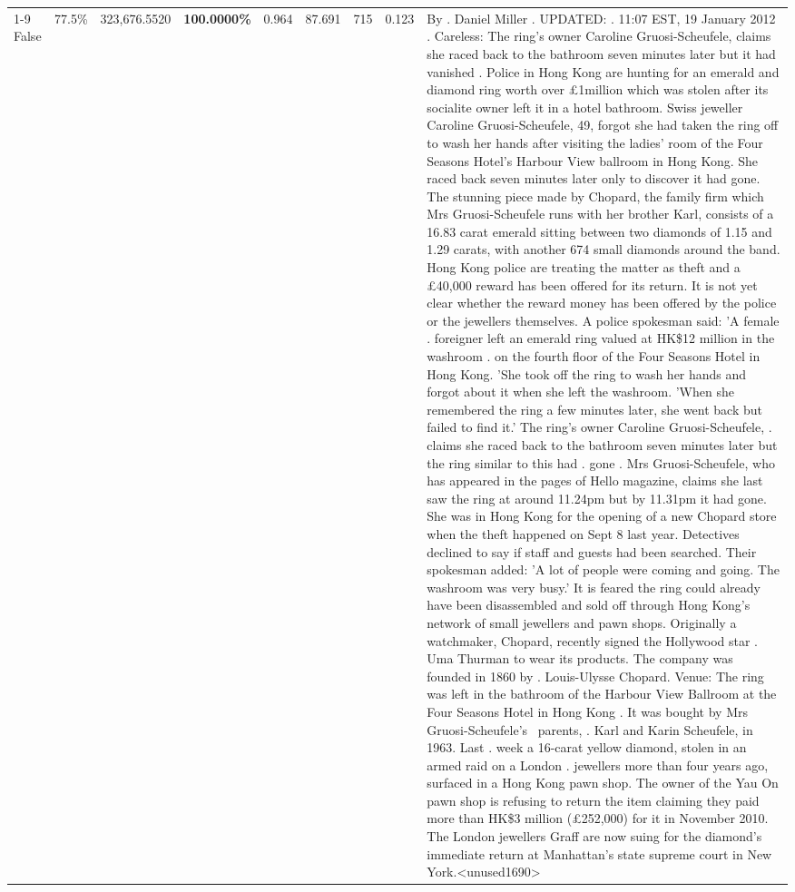 \begin{table}[H]
\begin{tabular}{lllrlllll}
\cline{1-9} \cline{2-9}
False & 77.5\% & 323,676.5520 & \bfseries \color{red} 100.0000\% & 0.964 & 87.691 & 715 & 0.123 & By . Daniel Miller . UPDATED: . 11:07 EST, 19 January 2012 . Careless: The ring's owner Caroline Gruosi-Scheufele, claims she raced back to the bathroom seven minutes later but it had vanished . Police in Hong Kong are hunting for an emerald and diamond ring worth over £1million which was stolen after its socialite owner left it in a hotel bathroom. Swiss jeweller Caroline Gruosi-Scheufele, 49, forgot she had taken the ring off to wash her hands after visiting the ladies' room of the Four Seasons Hotel's Harbour View ballroom in Hong Kong. She raced back seven minutes later only to discover it had gone. The stunning piece made by Chopard, the family firm which Mrs Gruosi-Scheufele runs with her brother Karl, consists of a 16.83 carat emerald sitting between two diamonds of 1.15 and 1.29 carats, with another 674 small diamonds around the band. Hong Kong police are treating the matter as theft and a £40,000 reward has been offered for its return. It is not yet clear whether the reward money has been offered by the police or the jewellers themselves. A police spokesman said: 'A female . foreigner left an emerald ring valued at HK\$12 million in the washroom . on the fourth floor of the Four Seasons Hotel in Hong Kong. 'She took off the ring to wash her hands and forgot about it when she left the washroom. 'When she remembered the ring a few minutes later, she went back but failed to find it.' The ring's owner Caroline Gruosi-Scheufele, . claims she raced back to the bathroom seven minutes later but the ring similar to this had . gone . Mrs Gruosi-Scheufele, who has appeared in the pages of Hello magazine, claims she last saw the ring at around 11.24pm but by 11.31pm it had gone. She was in Hong Kong for the opening of a new Chopard store when the theft happened on Sept 8 last year. Detectives declined to say if staff and guests had been searched. Their spokesman added: 'A lot of people were coming and going. The washroom was very busy.' It is feared the ring could already have been disassembled and sold off through Hong Kong's network of small jewellers and pawn shops. Originally a watchmaker, Chopard, recently signed the Hollywood star . Uma Thurman to wear its products. The company was founded in 1860 by . Louis-Ulysse Chopard. Venue: The ring was left in the bathroom of the Harbour View Ballroom at the Four Seasons Hotel in Hong Kong . It was bought by Mrs Gruosi-Scheufele's  parents, . Karl and Karin Scheufele, in 1963. Last . week a 16-carat yellow diamond, stolen in an armed raid on a London . jewellers more than four years ago, surfaced in a Hong Kong pawn shop. The owner of the Yau On pawn shop is refusing to return the item claiming they paid more than HK\$3 million (£252,000) for it in November 2010. The London jewellers Graff are now suing for the diamond’s immediate return at Manhattan’s state supreme court in New York.<unused1690> \\

\end{tabular}
\end{table}
